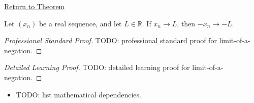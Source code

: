 \newpage
{}
\label{prf:limit-of-a-negation}

\begin{remark*}[Return]
\hyperref[thm:limit-of-a-negation]{Return to Theorem}
\end{remark*}

\begin{theorem*}
Let $(x_n)$ be a real sequence, and let $L\in\mathbb{R}$. If $x_n\to L$,
then $-x_n\to -L$.

\smallskip
\noindent
\end{theorem*}

\begin{proof}[Professional Standard Proof]
\LRAProofBodyStart
TODO: professional standard proof for limit-of-a-negation.
\end{proof}

\begin{proof}[Detailed Learning Proof]
\LRAProofBodyStart
TODO: detailed learning proof for limit-of-a-negation.
\end{proof}

\begin{remark*}
\end{remark*}

\begin{dependencies}
\begin{itemize}
  \item TODO: list mathematical dependencies.
\end{itemize}
\end{dependencies}

\clearpage
